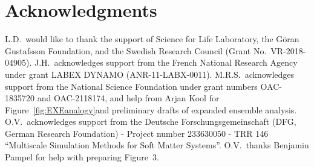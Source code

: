 \documentclass[9pt,review]{livecoms}
\begin{document}
\section*{Acknowledgments}
L.D.~would like to thank the support of Science for Life Laboratory, the Göran Gustafsson Foundation, and the Swedish Research Council (Grant No.~VR-2018-04905).
J.H.~acknowledges support from the French National Research Agency under grant LABEX DYNAMO (ANR-11-LABX-0011).
M.R.S.~acknowledges support from the National Science Foundation under grant numbers OAC-1835720 and OAC-2118174, and help from Arjan Kool for Figure~\ref{fig:EXEanalogy}and preliminary drafts of expanded ensemble analysis.
O.V.~acknowledges support from the Deutsche Forschungsgemeinschaft (DFG, German Research Foundation) - Project number 233630050 - TRR 146 ``Multiscale Simulation Methods for Soft Matter Systems''.
O.V.~thanks Benjamin Pampel for help with preparing Figure~3.

\makeorcid




\appendix
\end{document}

